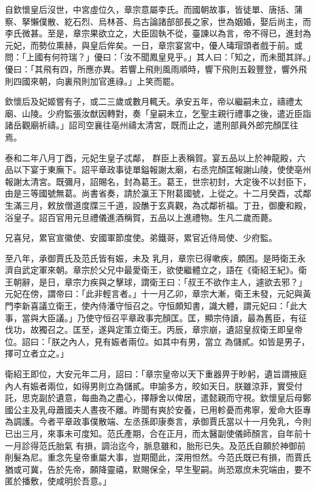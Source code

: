 \begin{pinyinscope}
 自欽懷皇后沒世，中宮虛位久，章宗意屬李氏。而國朝故事，皆徒單、唐括、蒲察、拏懶僕散、紇石烈、烏林荅、烏古論諸部部長之家，世為姻婚，娶后尚主，而李氏微甚。至是，章宗果欲立之，大臣固執不從，臺諫以為言，帝不得已，進封為
 元妃，而勢位熏赫，與皇后侔矣。一日，章宗宴宮中，優人瑇瑁頭者戲于前。或問：「上國有何符瑞？」優曰：「汝不聞鳳皇見乎。」其人曰：「知之，而未聞其詳。」優曰：「其飛有四，所應亦異。若響上飛則風雨順時，響下飛則五穀豐登，響外飛則四國來朝，向裏飛則加官進祿。」上笑而罷。



 欽懷后及妃姬嘗有子，或二三歲或數月輒夭。承安五年，帝以繼嗣未立，禱禮太廟、山陵。少府監張汝猷因轉對，奏「皇嗣未立，乞聖主親行禮事之後，遣近臣詣諸岳觀廟祈禱。」詔司空襄往亳州禱太清宮，既而止之，遣刑部員外郎完顏匡往焉。



 泰和二年八月丁酉，元妃生皇子忒鄰，
 群臣上表稱賀。宴五品以上於神龍殿，六品以下宴于東廡下。詔平章政事徒單鎰報謝太廟，右丞完顏匡報謝山陵，使使亳州報謝太清宮。既彌月，詔賜名，封為葛王。葛王，世宗初封，大定後不以封臣下，由是三等國號無葛。尚書省奏，請於瀛王下附葛國號，上從之。十二月癸酉，忒鄰生滿三月，敕放僧道度牒三千道，設醮于玄真觀，為忒鄰祈福。丁丑，御慶和殿，浴皇子。詔百官用元旦禮儀進酒稱賀，五品以上進禮物。生凡二歲而薨。



 兄喜兒，累官宣徽使、安國軍節度使。弟鐵哥，累官近侍局使、少府監。



 至八年，承御賈氏及范氏皆有娠，未及
 乳月，章宗已得嗽疾，頗困。是時衛王永濟自武定軍來朝。章宗於父兄中最愛衛王，欲使繼體立之，語在《衛紹王紀》。衛王朝辭，是日，章宗力疾與之擊球，謂衛王曰：「叔王不欲作主人，遽欲去邪？」元妃在傍，謂帝曰：「此非輕言者。」十一月乙卯，章宗大漸，衛王未發，元妃與黃門李新喜議立衛王，使內侍潘守恒召之。守恒頗知書，識大體，謂元妃曰：「此大事，當與大臣議。」乃使守恒召平章政事完顏匡。匡，顯宗侍讀，最為舊臣，有征伐功，故獨召之。匡至，遂與定策立衛王。丙辰，章宗崩，遺詔皇叔衛王即皇帝位。詔曰：「朕之內人，見有娠者兩位。如其中有男，當立
 為儲貳。如皆是男子，擇可立者立之。」



 衛紹王即位，大安元年二月，詔曰：「章宗皇帝以天下重器畀于眇躬，遺旨謂掖庭內人有娠者兩位，如得男則立為儲貳。申諭多方，皎如天日。朕雖涼菲，實受付託，思克副於遺意，每曲為之盡心，擇靜舍以俾居，遣懿親而守視。欽懷皇后母鄭國公主及乳母蕭國夫人晝夜不離。昨聞有爽於安養，已用軫憂而弗寧，爰命大臣專為調護。今者平章政事僕散端、左丞孫即康奏言，承御賈氏當以十一月免乳，今則已出三月，來事未可度知。范氏產期，合在正月，而太醫副使儀師顏言，自年前十一月診得范氏胎氣
 有損，調治迄今，脈息雖和，胎形已失。及范氏自願於神御前削髮為尼。重念先皇帝重屬大事，豈期聞此，深用怛然。今范氏既已有損，而賈氏猶或可冀，告於先帝，願降靈禧，默賜保全，早生聖嗣。尚恐眾庶未究端由，要不匿於播敷，使咸明於吾意。」




\end{pinyinscope}
